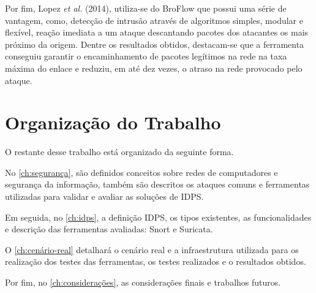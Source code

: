 Por fim, Lopez \textit{et al.} (2014), utiliza-se do BroFlow que possui uma série de vantagem, como, detecção de intrusão através de algoritmos simples, modular e flexível, reação imediata a um ataque descantando pacotes dos atacantes os mais próximo da origem. Dentre os resultados obtidos, destacam-se que a ferramenta conseguiu garantir o encaminhamento de pacotes legítimos na rede na taxa máxima do enlace e reduziu, em até dez vezes, o atraso na rede provocado pelo ataque.

\section{Organização do Trabalho} \label{sec:organização-do-trabalho}

O restante desse trabalho está organizado da seguinte forma.

No \autoref{ch:segurança}, são definidos conceitos sobre redes de computadores e segurança da informação, também são descritos os ataques comuns e ferramentas utilizadas para validar e avaliar as soluções de IDPS.

Em seguida, no \autoref{ch:idps}, a definição IDPS, os tipos existentes, as funcionalidades e descrição das ferramentas avaliadas: Snort e Suricata.

O \autoref{ch:cenário-real} detalhará o cenário real e a infraestrutura utilizada para os realização dos testes das ferramentas, os testes realizados e o resultados obtidos.

Por fim, no \autoref{ch:considerações}, as considerações finais e trabalhos futuros.
